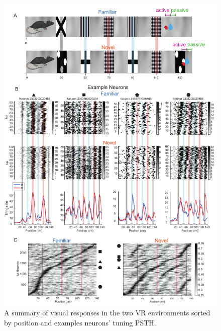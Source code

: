 \begin{figure}
    \centering
    \includegraphics[width=1\linewidth]{figures//Chapter 4 V1/fig1_VR_setup_and_responses.pdf}
    \caption{A summary of visual responses in the two VR environments sorted by position and examples neurons' tuning PSTH.}
    \label{fig:population map}
\end{figure}




